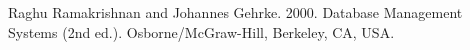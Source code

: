 \documentclass{beamer}
\begin{document}
\begin{frame}[allowframebreaks]
{\begin{thebibliography}{99}







  Raghu Ramakrishnan and Johannes Gehrke. 2000. Database Management Systems (2nd ed.). Osborne/McGraw-Hill, Berkeley, CA, USA. 

\end{thebibliography}
}
\end{frame}
\end{document}
